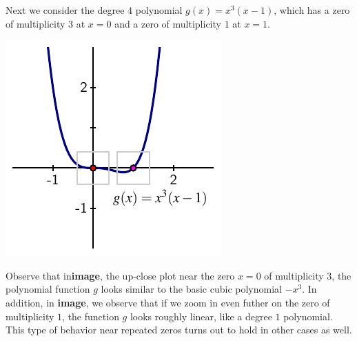 \documentclass{ximera}
\begin{document}
Next we consider the degree $4$ polynomial $g(x) = x^3 (x-1)$, which has a zero of multiplicity $3$ at $x = 0$ and a zero of multiplicity $1$ at $x = 1$.%
\begin{image}
\includegraphics[width=0.5\linewidth]{images/polynomial-3-1}
\end{image}
Observe that in\textbf{image}, the up-close plot near the zero $x = 0$ of multiplicity $3$, the polynomial function $g$ looks similar to the basic cubic polynomial $-x^3$.  In addition, in \textbf{image}, we observe that if we zoom in even futher on the zero of multiplicity $1$, the function $g$ looks roughly linear, like a degree $1$ polynomial.  This type of behavior near repeated zeros turns out to hold in other cases as well.%
\end{document}
